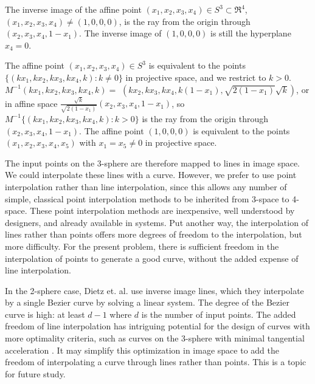 \begin{corollary}
\label{cor:inverseline}
The inverse image of the affine point $(x_1,x_2,x_3,x_4) \in S^3 \subset \Re^4$,
$(x_1,x_2,x_3,x_4) \neq (1,0,0,0)$,
is the ray from the origin through $(x_2,x_3,x_4,1-x_1)$.
The inverse image of $(1,0,0,0)$ is still the hyperplane $x_4=0$.
\end{corollary}
\prf
The affine point $(x_1,x_2,x_3,x_4) \in S^3$ is equivalent to the points
$\{ (kx_1,kx_2,kx_3,kx_4,k): k \neq 0 \}$ in projective space,
and we restrict to $k>0$.
$M^{-1}(kx_{1},kx_{2},kx_{3},kx_{4},k) =$ 
$(kx_{2},kx_{3},kx_{4},k(1-x_{1}),\sqrt{2(1-x_{1})} \sqrt{k})$, 
or in affine space 
$\frac{\sqrt{k}}{\sqrt{2(1-x_{1})}} (x_{2},x_{3},x_{4},1-x_{1})$,
so $M^{-1}\{(kx_{1},kx_{2},kx_{3},kx_{4},k): k > 0 \}$
is the ray from the origin through $(x_{2},x_{3},x_{4},1-x_{1})$.
The affine point $(1,0,0,0)$ is equivalent to the points
$(x_1,x_2,x_3,x_4,x_5)$ with $x_1=x_5 \neq 0$ in projective space.
\QED

The input points on the 3-sphere are therefore mapped to lines in image space.
We could interpolate these lines with a curve.
However, we prefer to use point interpolation rather than line interpolation,
since this allows
any number of simple, classical point interpolation methods to be inherited
from 3-space to 4-space.
These point interpolation methods are inexpensive, well understood
by designers, and already available in systems.
Put another way, the interpolation of lines rather than points offers
more degrees of freedom to the interpolation, but more difficulty.
For the present problem, there is sufficient freedom in the interpolation of points
to generate a good curve, without the added expense of line interpolation.


In the 2-sphere case, Dietz et. al. \cite{dietz93}
use inverse image lines, which they interpolate by a single Bezier curve
by solving a linear system.
The degree of the Bezier curve is high: at least $d-1$ where $d$ is
the number of input points.
The added freedom of line interpolation has intriguing
potential for the design of curves with more optimality criteria, 
such as curves on the 3-sphere with minimal tangential acceleration \cite{barr92}.
It may simplify this optimization in image space to add the freedom
of interpolating a curve through lines rather than points.
This is a topic for future study.

